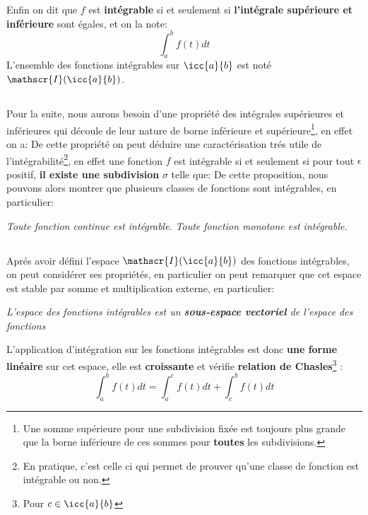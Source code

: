 Enfin on dit que \(f\) est \textbf{intégrable} si et seulement si \textbf{l'intégrale supérieure et inférieure} sont égales, et on la note:
\[
   \int_{a}^{b} f(t) d t  
\]
L'ensemble des fonctions intégrables sur \(\icc{a}{b}\) est noté \(\mathscr{I}(\icc{a}{b})\).
\pagebreak
\subsection*{}

Pour la suite, nous aurons besoin d'une propriété des intégrales supérieures et inférieures qui découle de leur nature de borne inférieure et supérieure\footnote[1]{Une somme supérieure pour une subdivision fixée est toujours plus grande que la borne inférieure de ces sommes pour \textbf{toutes} les subdivisions.}, en effet on a:
De cette propriété on peut déduire une caractérisation trés utile de l'intégrabilité\footnote[2]{En pratique, c'est celle ci qui permet de prouver qu'une classe de fonction est intégrable ou non.}, en effet une fonction \(f\) est intégrable si et seulement si pour tout \(\epsilon\) positif, \textbf{il existe une subdivision} \(\sigma\) telle que:
De cette proposition, nous pouvons alors montrer que plusieurs classes de fonctions sont intégrables, en particulier:
\begin{center}
   \textit{Toute fonction continue est intégrable.}\+
   \textit{Toute fonction monotone est intégrable. }
\end{center}
\subsection*{}

Aprés avoir défini l'espace \(\mathscr{I}(\icc{a}{b})\) des fonctions intégrables, on peut considérer ses propriétés, en particulier on peut remarquer que cet espace est stable par somme et multiplication externe, en particulier:
\begin{center}
   \textit{L'espace des fonctions intégrables est un \textbf{sous-espace vectoriel} de l'espace des fonctions}
\end{center}
L'application d'intégration sur les fonctions intégrables est donc \textbf{une forme linéaire} sur cet espace, elle est \textbf{croissante} et vérifie \textbf{relation de Chasles}\footnote[3]{Pour \(c \in \icc{a}{b}\)} :
\[
   \int_{a}^{b} f(t) d t = \int_{a}^{c} f(t) d t + \int_{c}^{b} f(t) d t
\]
  

